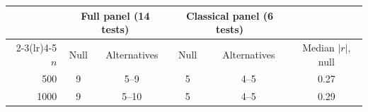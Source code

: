 \begin{tabular}{rccccc}
\toprule
 & \multicolumn{2}{c}{Full panel (14 tests)} & \multicolumn{2}{c}{Classical panel (6 tests)} & \\
\cmidrule(lr){2-3}\cmidrule(lr){4-5}
$n$ & Null & Alternatives & Null & Alternatives & Median $|r|$, null \\
\midrule
500 & 9 & 5--9 & 5 & 4--5 & 0.27 \\
1000 & 9 & 5--10 & 5 & 4--5 & 0.29 \\
\bottomrule
\end{tabular}